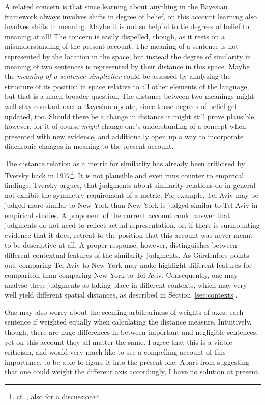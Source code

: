 \documentclass[11pt, a4paper]{scrartcl}
\renewcommand{\i}[1]{\emph{#1}}
\begin{document}
A related concern is that since learning about anything in the Bayesian framework always involves shifts in degree of belief, on this account learning also involves shifts in meaning. Maybe it is not so helpful to tie degrees of belief to meaning at all! The concern is easily dispelled, though, as it rests on a misunderstanding of the present account. The meaning of a sentence is not represented by the location in the space, but instead the degree of similarity in meaning of two sentences is represented by their distance in this space. Maybe the \i{meaning of a sentence simpliciter} could be assessed by analysing the structure of its position in space relative to all other elements of the language, but that is a much broader question. The distance between two meanings might well stay constant over a Bayesian update, since those degrees of belief get updated, too. Should there be a change in distance it might still prove plausible, however, for it of course \i{might} change one's understanding of a concept when presented with new evidence, and additionally open up a way to incorporate diachronic changes in meaning to the present account.

The distance relation as a metric for similarity has already been criticised by Tversky back in 1977\footnote{cf. \textcite{tversky1977features}, also \textcite[112]{gärdenfors2004conceptual} for a discussion}. It is not plausible and even runs counter to empirical findings, Tversky argues, that judgments about similarity relations do in general not exhibit the symmetry requirement of a metric. For example, Tel Aviv may be judged more similar to New York than New York is judged similar to Tel Aviv in empirical studies. A proponent of the current account could answer that judgments do not need to reflect actual representation, or, if there is surmounting evidence that it does, retreat to the position that this account was never meant to be descriptive at all. A proper response, however, distinguishes between different contextual features of the similarity judgments. As Gärdenfors points out, comparing Tel Aviv to New York may make highlight different features for comparison than comparing New York to Tel Aviv. Consequently, one may analyse these judgments as taking place in different contexts, which may very well yield different spatial distances, as described in Section~\ref{sec:contexts}.

One may also worry about the seeming arbitrariness of weights of axes: each sentence if weighted equally when calculating the distance measure. Intuitively, though, there are huge differences in between important and negligible sentences, yet on this account they all matter the same. I agree that this is a viable criticism, and would very much like to see a compelling account of this importance, to be able to figure it into the present one. Apart from suggesting that one could weight the different axis accordingly, I have no solution at present.
\end{document}
